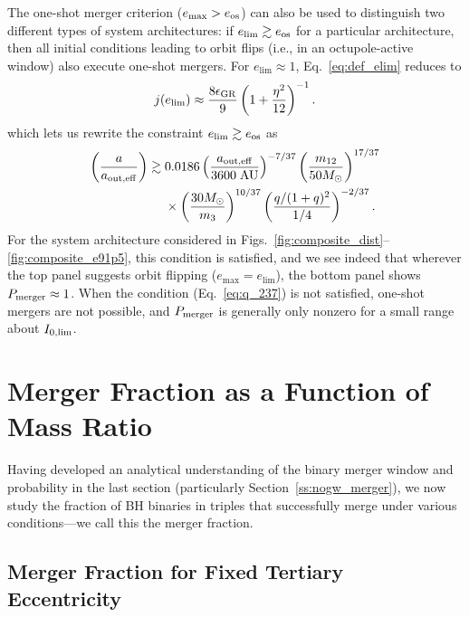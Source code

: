\documentclass[
        fleqn,
        usenatbib,
    ]{mnras}
\newcommand*{\p}[1]{\left(#1\right)}
\begin{document}
The one-shot merger criterion ($e_{\max} > e_{\rm os}$) can also be used to
distinguish two different types of system architectures: if $e_{\lim} \gtrsim
e_{\rm os}$ for a particular architecture, then all initial conditions leading
to orbit flips (i.e., in an octupole-active window) also execute one-shot
mergers. For $e_{\lim} \approx 1$, Eq.~\eqref{eq:def_elim} reduces to
\begin{align}
    j(e_{\lim}) \approx \frac{8\epsilon_{\rm GR}}{9}\p{1 +
        \frac{\eta^2}{12}}^{-1}.
\end{align}
which lets us rewrite the constraint $e_{\lim} \gtrsim e_{\rm os}$ as
\begin{align}
    \p{\frac{a}{a_{\rm out, eff}}} \gtrsim{}&
        0.0186
        \p{\frac{a_{\rm out, eff}}{3600\;\mathrm{AU}}}^{-7/37}
        \p{\frac{m_{12}}{50M_{\odot}}}^{17/37}\nonumber\\
        &\times\p{\frac{30M_{\odot}}{m_3}}^{10/37}
        \p{\frac{q / (1 + q)^2}{1/4}}^{-2/37}.\label{eq:q_237}
\end{align}
For the system architecture considered in
Figs.~\ref{fig:composite_dist}--\ref{fig:composite_e91p5}, this condition is
satisfied, and we see indeed that wherever the top panel suggests orbit flipping
($e_{\max} = e_{\lim}$), the bottom panel shows $P_{\rm merger} \approx 1$. When
the condition (Eq.~\ref{eq:q_237}) is not satisfied, one-shot mergers are not
possible, and $P_{\rm merger}$ is generally only nonzero for a small range about
$I_{\rm 0, \lim}$.

\section{Merger Fraction as a Function of Mass Ratio}\label{s:merger_frac}

Having developed an analytical understanding of the binary merger window and
probability in the last section (particularly Section~\ref{ss:nogw_merger}), we
now study the fraction of BH binaries in triples that successfully merge under
various conditions---we call this the merger fraction.

\subsection{Merger Fraction for Fixed Tertiary Eccentricity}
\end{document}
